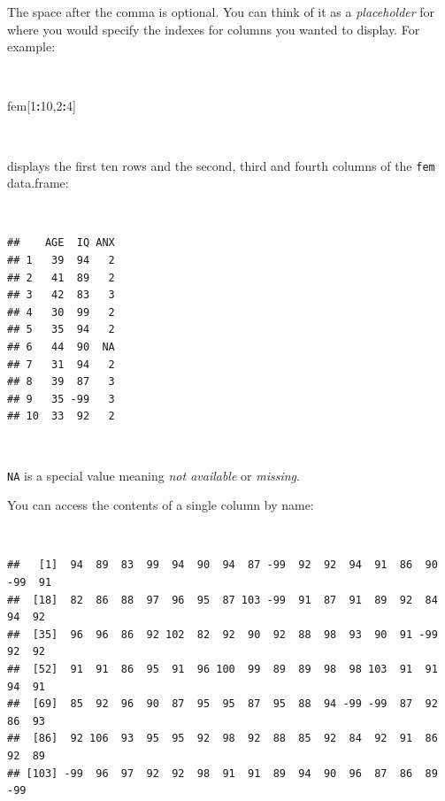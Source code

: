 \documentclass[12pt,a4paper]{book}
\newenvironment{Shaded}{\begin{snugshade}}{\end{snugshade}}
\newcommand{\DecValTok}[1]{\textcolor[rgb]{0.00,0.00,0.81}{#1}}
\newcommand{\OperatorTok}[1]{\textcolor[rgb]{0.81,0.36,0.00}{\textbf{#1}}}
\newcommand{\NormalTok}[1]{#1}
\theoremstyle{definition}
\theoremstyle{definition}
\theoremstyle{definition}
\theoremstyle{remark}
\begin{document}
\newpage

The space after the comma is optional. You can think of it as a
\emph{placeholder} for where you would specify the indexes for columns
you wanted to display. For example:

~

\begin{Shaded}
\begin{Highlighting}[]
\NormalTok{fem[}\DecValTok{1}\OperatorTok{:}\DecValTok{10}\NormalTok{,}\DecValTok{2}\OperatorTok{:}\DecValTok{4}\NormalTok{]}
\end{Highlighting}
\end{Shaded}

~

displays the first ten rows and the second, third and fourth columns of
the \texttt{fem} data.frame:

~

\begin{verbatim}
##    AGE  IQ ANX
## 1   39  94   2
## 2   41  89   2
## 3   42  83   3
## 4   30  99   2
## 5   35  94   2
## 6   44  90  NA
## 7   31  94   2
## 8   39  87   3
## 9   35 -99   3
## 10  33  92   2
\end{verbatim}

~

\texttt{NA} is a special value meaning \emph{not available} or
\emph{missing}.

You can access the contents of a single column by name:

~

\begin{Shaded}
\end{Shaded}

\begin{verbatim}
##   [1]  94  89  83  99  94  90  94  87 -99  92  92  94  91  86  90 -99  91
##  [18]  82  86  88  97  96  95  87 103 -99  91  87  91  89  92  84  94  92
##  [35]  96  96  86  92 102  82  92  90  92  88  98  93  90  91 -99  92  92
##  [52]  91  91  86  95  91  96 100  99  89  89  98  98 103  91  91  94  91
##  [69]  85  92  96  90  87  95  95  87  95  88  94 -99 -99  87  92  86  93
##  [86]  92 106  93  95  95  92  98  92  88  85  92  84  92  91  86  92  89
## [103] -99  96  97  92  92  98  91  91  89  94  90  96  87  86  89 -99
\end{verbatim}

~
\end{document}
